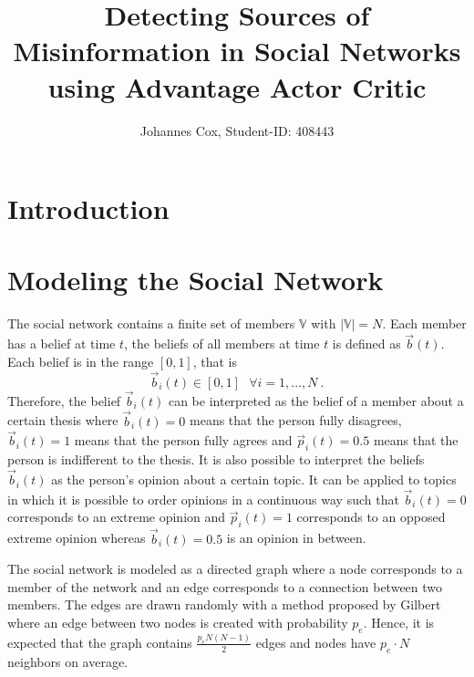 \documentclass[11pt, a4paper]{article}
\title{Detecting Sources of Misinformation in Social Networks using Advantage Actor Critic}
\author{Johannes Cox, Student-ID: 408443}
\begin{document}
	
\maketitle

\section{Introduction}

\section{Modeling the Social Network} \label{sec:SN}
The social network contains a finite set of members $\mathbb{V}$ with $|\mathbb{V}| = N$. Each member has a belief at time $t$, the beliefs of all members at time $t$ is defined as $\vec{b}(t)$. Each belief is in the range $[0,1]$, that is 
%
\begin{equation}
\vec{b}_i(t) \in [0,1] \ \ \ \forall i = 1,...,N \ .
\end{equation}
%
Therefore, the belief $\vec{b}_i(t)$ can be interpreted as the belief of a member about a certain thesis where $	\vec{b}_i(t) = 0$ means that the person fully disagrees, $\vec{b}_i(t) = 1$ means that the person fully agrees and $\vec{p}_i(t) = 0.5$ means that the person is indifferent to the thesis. It is also possible to interpret the beliefs $\vec{b}_i(t)$ as the person's opinion about a certain topic. It can be applied to topics in which it is possible to order opinions in a continuous way such that $\vec{b}_i(t) = 0$ corresponds to an extreme opinion and $\vec{p}_i(t) = 1$ corresponds to an opposed extreme opinion whereas $\vec{b}_i(t) = 0.5$ is an opinion in between. \newline

The social network is modeled as a directed graph where a node corresponds to a member of the network and an edge corresponds to a connection between two members. The edges are drawn randomly with a method proposed by Gilbert \cite{random_graphs} where an edge between two nodes is created with probability $p_{e}$. Hence, it is expected that the graph contains $\frac{p_{e}N(N-1)}{2}$ edges and nodes have $p_{e}\cdot N$ neighbors on average.\newline
\end{document}
